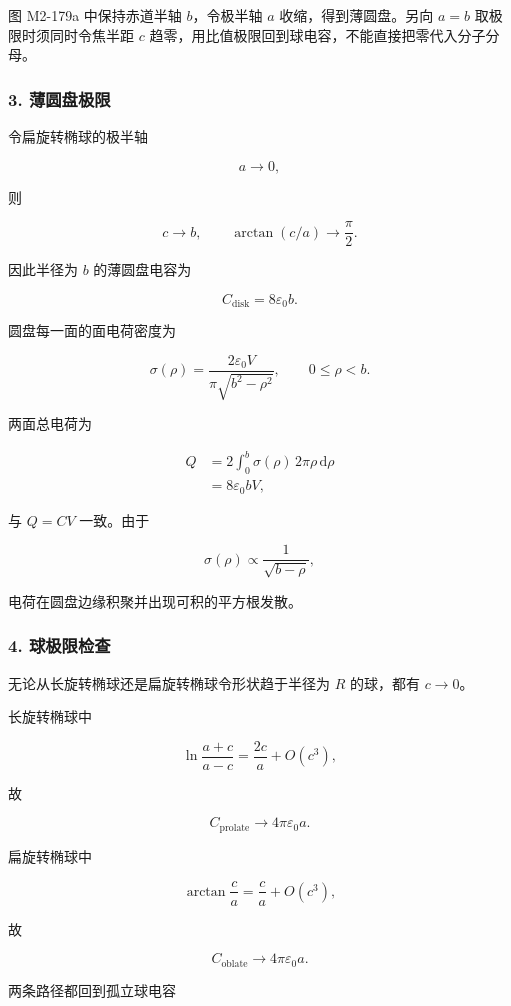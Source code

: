 图 M2-179a 中保持赤道半轴 \(b\)，令极半轴 \(a\) 收缩，得到薄圆盘。另向
\(a=b\) 取极限时须同时令焦半距 \(c\)
趋零，用比值极限回到球电容，不能直接把零代入分子分母。

\subsubsection{3. 薄圆盘极限}\label{m2:ux8584ux5706ux76d8ux6781ux9650}

令扁旋转椭球的极半轴

\[
a\to0,
\]

则

\[
c\to b,
\qquad
\arctan(c/a)\to\frac\pi2.
\]

因此半径为 \(b\) 的薄圆盘电容为

\[
\boxed{
C_{\text{disk}}
=
8\varepsilon_0b
}.
\]

圆盘每一面的面电荷密度为

\[
\boxed{
\sigma(\rho)
=
\frac{2\varepsilon_0V}
{\pi\sqrt{b^2-\rho^2}},
\qquad
0\le\rho<b
}.
\]

两面总电荷为

\[
\begin{aligned}
Q
&=
2\int_0^b
\sigma(\rho)\,2\pi\rho\,\mathrm d\rho\\
&=
8\varepsilon_0bV,
\end{aligned}
\]

与 \(Q=CV\) 一致。由于

\[
\sigma(\rho)
\propto
\frac1{\sqrt{b-\rho}},
\]

电荷在圆盘边缘积聚并出现可积的平方根发散。

\subsubsection{4. 球极限检查}\label{m2:ux7403ux6781ux9650ux68c0ux67e5}

无论从长旋转椭球还是扁旋转椭球令形状趋于半径为 \(R\) 的球，都有
\(c\to0\)。

长旋转椭球中

\[
\ln\frac{a+c}{a-c}
=
\frac{2c}{a}+O(c^3),
\]

故

\[
C_{\text{prolate}}
\to
4\pi\varepsilon_0a.
\]

扁旋转椭球中

\[
\arctan\frac ca
=
\frac ca+O(c^3),
\]

故

\[
C_{\text{oblate}}
\to
4\pi\varepsilon_0a.
\]

两条路径都回到孤立球电容

